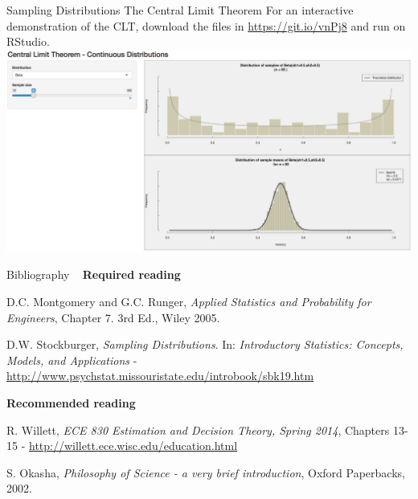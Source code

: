 \documentclass[t]{beamer}
\begin{document}
\begin{ftst}
{Sampling Distributions}
{The Central Limit Theorem}
For an interactive demonstration of the CLT, download the files in {\small\url{https://git.io/vnPj8}} and run on RStudio.
\vone
{\centering\includegraphics[width=\textwidth]{../figs/CLTdemo.png}}
\end{ftst}



\begin{ftst}
{Bibliography}
{\ }
\scriptsize
\textbf{Required reading}

\benums D.C. Montgomery and G.C. Runger, \textit{Applied Statistics and Probability for Engineers}, Chapter 7. 3rd Ed., Wiley 2005.
\item D.W. Stockburger, \textit{Sampling Distributions}. In: \textit{Introductory Statistics: Concepts, Models, and Applications} - \url{http://www.psychstat.missouristate.edu/introbook/sbk19.htm}
\eenum

\textbf{Recommended reading}

\benums R. Willett, \textit{ ECE 830 Estimation and Decision Theory, Spring 2014}, Chapters 13-15 - \url{http://willett.ece.wisc.edu/education.html}
\item S. Okasha, \textit{Philosophy of Science - a very brief introduction}, Oxford Paperbacks, 2002.
\eenum
\end{ftst}



\end{document}
